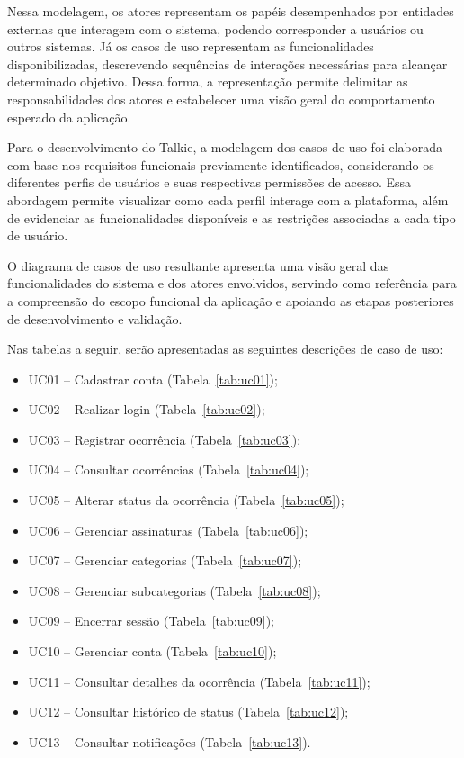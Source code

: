\documentclass[12pt,a4paper]{article}
\begin{document}
Nessa modelagem, os atores representam os papéis desempenhados por entidades externas que interagem com o sistema, podendo corresponder a usuários ou outros sistemas. Já os casos de uso representam as funcionalidades disponibilizadas, descrevendo sequências de interações necessárias para alcançar determinado objetivo. Dessa forma, a representação permite delimitar as responsabilidades dos atores e estabelecer uma visão geral do comportamento esperado da aplicação.

Para o desenvolvimento do Talkie, a modelagem dos casos de uso foi elaborada com base nos requisitos funcionais previamente identificados, considerando os diferentes perfis de usuários e suas respectivas permissões de acesso. Essa abordagem permite visualizar como cada perfil interage com a plataforma, além de evidenciar as funcionalidades disponíveis e as restrições associadas a cada tipo de usuário.

O diagrama de casos de uso resultante apresenta uma visão geral das funcionalidades do sistema e dos atores envolvidos, servindo como referência para a compreensão do escopo funcional da aplicação e apoiando as etapas posteriores de desenvolvimento e validação.

Nas tabelas a seguir, serão apresentadas as seguintes descrições de caso de uso:

\begin{itemize}
\item UC01 -- Cadastrar conta (Tabela~\ref{tab:uc01});
\item UC02 -- Realizar login (Tabela~\ref{tab:uc02});
\item UC03 -- Registrar ocorrência (Tabela~\ref{tab:uc03});
\item UC04 -- Consultar ocorrências (Tabela~\ref{tab:uc04});
\item UC05 -- Alterar status da ocorrência (Tabela~\ref{tab:uc05});
\item UC06 -- Gerenciar assinaturas (Tabela~\ref{tab:uc06});
\item UC07 -- Gerenciar categorias (Tabela~\ref{tab:uc07});
\item UC08 -- Gerenciar subcategorias (Tabela~\ref{tab:uc08});
\item UC09 -- Encerrar sessão (Tabela~\ref{tab:uc09});
\item UC10 -- Gerenciar conta (Tabela~\ref{tab:uc10});
\item UC11 -- Consultar detalhes da ocorrência (Tabela~\ref{tab:uc11});
\item UC12 -- Consultar histórico de status (Tabela~\ref{tab:uc12});
\item UC13 -- Consultar notificações (Tabela~\ref{tab:uc13}).
\end{itemize}
\end{document}

